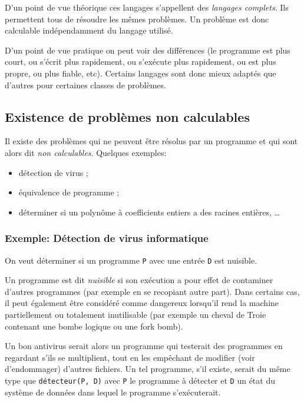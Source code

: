 D'un point de vue théorique ces langages s'appellent des \emph{langages complets}. Ils permettent tous de résoudre les mêmes problèmes. Un problème est donc calculable indépendamment du langage utilisé.

D'un point de vue pratique on peut voir des différences (le programme est plus court, ou s'écrit plus rapidement, ou s'exécute plus rapidement, ou est plus propre, ou plus fiable, etc). Certains langages sont donc mieux adaptés que d'autres pour certaines classes de problèmes.


\subsection{Existence de problèmes non calculables}
\label{subsec:existence_de_problemes_non_calculables}
	Il existe des problèmes qui ne peuvent être résolus par un programme et qui sont alors dit \emph{non calculables}.
	Quelques exemples:
	\begin{itemize}
		\item détection de virus ;
		\item équivalence de programme ;
		\item déterminer si un polynôme à coefficients entiers a des racines entières, \ldots
	\end{itemize}

\subsubsection{Exemple: Détection de virus informatique}
\label{subsubsec:detection_de_virus_informatique}
On veut déterminer si un programme \lstinline|P| avec une entrée \lstinline|D| est nuisible.

\begin{mydef}
	Un programme est dit \emph{nuisible} si son exécution a pour effet de contaminer d'autres programmes (par exemple en se recopiant autre part). Dans certains cas, il peut également être considéré comme dangereux lorsqu'il rend la machine partiellement ou totalement inutilisable (par exemple un cheval de Troie contenant une bombe logique ou une fork bomb).
\end{mydef}

Un bon antivirus serait alors un programme qui testerait des programmes en regardant s'ils se multiplient, tout en les empêchant de modifier (voir d'endommager) d'autres fichiers. Un tel programme, s'il existe, serait du même type que \lstinline|détecteur(P, D)| avec \lstinline|P| le programme à détecter et \lstinline|D| un état du système de données dans lequel le programme s'exécuterait.

